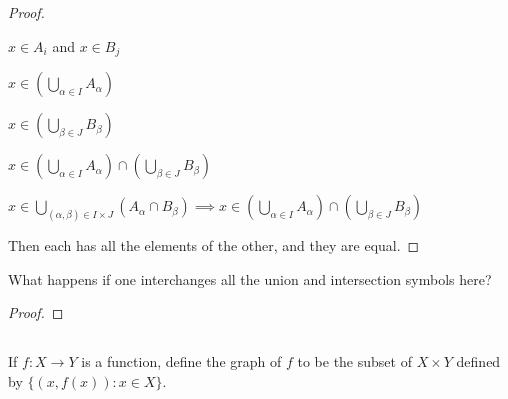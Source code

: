 \documentclass[../../main.tex]{subfiles}
\begin{document}
\begin{proof}
\begin{linebyline}[resume]
\begin{linebyline}
\begin{linebyline}
                \item $x \in A_{i}$ and $x \in B_{j}$ 
            \end{linebyline}
                \item $x \in (\bigcup_{\alpha \in I} A_{\alpha})$
                \item $x \in (\bigcup_{\beta \in J} B_{\beta})$
                \item $x \in (\bigcup_{\alpha \in I} A_{\alpha}) \cap (\bigcup_{\beta \in J} B_{\beta})$
        \end{linebyline}
        \item $x \in \bigcup_{(\alpha, \beta) \in I \times J} (A_{\alpha} \cap B_{\beta}) \implies x \in (\bigcup_{\alpha \in I} A_{\alpha}) \cap (\bigcup_{\beta \in J} B_{\beta})$ 
    \end{linebyline}
    Then each has all the elements of the other, and they are equal.
\end{proof}
\begin{xx}
    
\end{xx}
        
\begin{q}
    What happens if one interchanges all the union and intersection symbols here?
\end{q}

\begin{ans}
    
\end{ans}
    
\begin{proof}
    
\end{proof}
\begin{xx}
    
\end{xx}

\subsection{}
\begin{q}
    If $f : X \to Y$ is a function, define the graph of $f$ to be the subset of $X \times Y$ defined by $\{(x, f(x)) : x \in X\}$.
\end{q}
\end{document}
